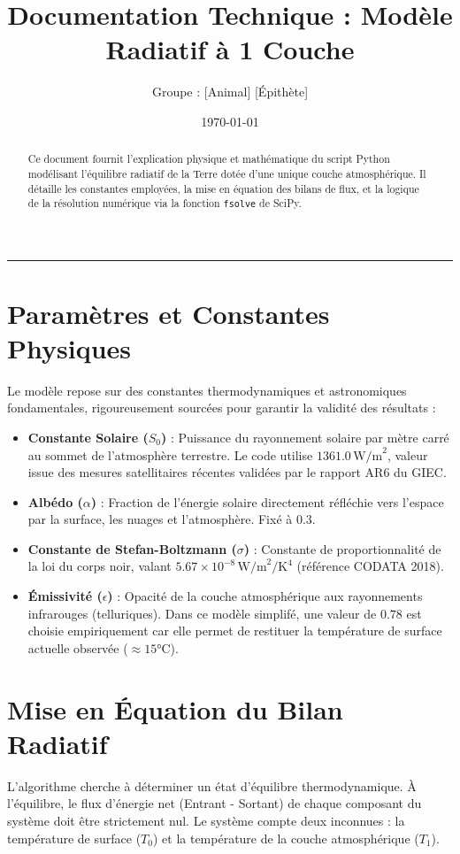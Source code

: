 \documentclass[11pt,a4paper]{article}
\title{Documentation Technique : Modèle Radiatif à 1 Couche}
\author{Groupe : [Animal] [Épithète]}
\date{\today}
\begin{document}
\maketitle

\begin{abstract}
Ce document fournit l'explication physique et mathématique du script Python modélisant l'équilibre radiatif de la Terre dotée d'une unique couche atmosphérique. Il détaille les constantes employées, la mise en équation des bilans de flux, et la logique de la résolution numérique via la fonction \texttt{fsolve} de SciPy.
\end{abstract}

\vspace{0.5cm}
\hrule
\vspace{0.5cm}


\section{Paramètres et Constantes Physiques}
Le modèle repose sur des constantes thermodynamiques et astronomiques fondamentales, rigoureusement sourcées pour garantir la validité des résultats :

\begin{itemize}
    \item \textbf{Constante Solaire ($S_0$)} : Puissance du rayonnement solaire par mètre carré au sommet de l'atmosphère terrestre. Le code utilise $1361.0 \, \text{W/m}^2$, valeur issue des mesures satellitaires récentes validées par le rapport AR6 du GIEC.
    \item \textbf{Albédo ($\alpha$)} : Fraction de l'énergie solaire directement réfléchie vers l'espace par la surface, les nuages et l'atmosphère. Fixé à $0.3$.
    \item \textbf{Constante de Stefan-Boltzmann ($\sigma$)} : Constante de proportionnalité de la loi du corps noir, valant $5.67 \times 10^{-8} \, \text{W/m}^2/\text{K}^4$ (référence CODATA 2018).
    \item \textbf{Émissivité ($\epsilon$)} : Opacité de la couche atmosphérique aux rayonnements infrarouges (telluriques). Dans ce modèle simplifé, une valeur de $0.78$ est choisie empiriquement car elle permet de restituer la température de surface actuelle observée ($\approx 15\text{°C}$).
\end{itemize}

\section{Mise en Équation du Bilan Radiatif}
L'algorithme cherche à déterminer un état d'équilibre thermodynamique. À l'équilibre, le flux d'énergie net (Entrant - Sortant) de chaque composant du système doit être strictement nul. Le système compte deux inconnues : la température de surface ($T_0$) et la température de la couche atmosphérique ($T_1$).
\end{document}

